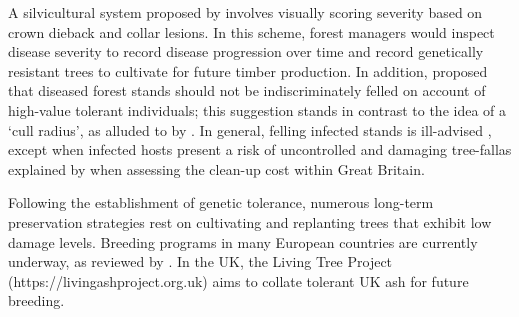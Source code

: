 A silvicultural system proposed by \cite{skovsgaard2017silvicultural} involves visually scoring severity based on crown dieback
and collar lesions. In this scheme, forest managers would inspect disease severity to record disease progression over time
and record genetically resistant trees to cultivate for future timber production. In addition, 
\cite{skovsgaard2017silvicultural} proposed that diseased forest stands should not be indiscriminately felled on account of high-value
tolerant individuals; this suggestion stands in contrast to the idea of a `cull radius', as alluded to by \cite{WEBIDEMICS}. 
In general, felling infected stands is ill-advised  \cite{chandelier2017ash}, except when infected hosts present a risk of uncontrolled 
and damaging tree-fall\textemdash as explained by \cite{ash-dieback-costs} when assessing the clean-up cost within Great Britain.

Following the establishment of genetic tolerance, numerous long-term preservation strategies 
rest on cultivating and replanting trees that exhibit low damage levels. Breeding 
programs in many European countries are currently underway, as reviewed by \cite{https://doi.org/10.1002/ppp3.10060}.
In the UK, the Living Tree Project (https://livingashproject.org.uk) aims to collate tolerant UK ash for future breeding.


